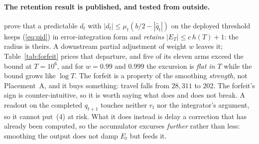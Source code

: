 \paragraph{The retention result is published, and tested from outside.}
\mbox{\citet[Corollary~2]{li2025o2cp}} prove that a predictable $d_t$ with $|d_t| \le
\mu_t(b/2-|\hat{q}_t|)$ on the deployed threshold keeps (\ref{eq:pid}) in error-integration form
and \emph{retains} $|E_T| \le c\,h(T)+1$: the radius is theirs. A downstream partial
adjustment of weight $w$ leaves it; Table~\ref{tab:forfeit} prices that
departure, and five of its eleven arms exceed the bound at $T = 10^6$, and for $w = 0.99$ and
$0.999$ the excursion is \emph{flat in $T$} while the bound grows like $\log T$. The
forfeit is a property of the smoothing \emph{strength}, not Placement~A, and it buys something:
travel falls from $28{,}311$ to $202$. The forfeit's sign is counter-intuitive, so it is worth
saying what does and does not break. A readout on the completed
$q_{t+1}$ touches neither $r_t$ nor the integrator's argument, so it cannot put~(4) at risk. What
it does instead is delay a correction that has already been computed, so the accumulator excurses
\emph{further} rather than less: smoothing the output does not damp $E_t$ but feeds it.

